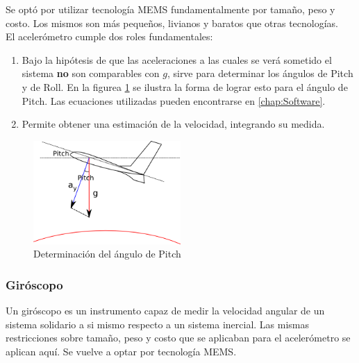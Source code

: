 \documentclass[main]{subfiles}
\begin{document}
Se opt\'o por utilizar tecnolog\'ia MEMS fundamentalmente por tama\~no, peso y costo. Los mismos son m\'as peque\~nos, livianos y baratos que otras tecnolog\'ias.\\



El aceler\'ometro cumple dos roles fundamentales:
\begin{enumerate}
\item Bajo la hip\'otesis de que las aceleraciones a las cuales se ver\'a sometido el sistema \textbf{no} son comparables con $g$, sirve para determinar los \'angulos de Pitch y de Roll. En la figurea \ref{fig:acc_pitch} se ilustra la forma de lograr esto para el \'angulo de Pitch. Las ecuaciones utilizadas pueden encontrarse en \ref{chap:Software}.
\item Permite obtener una estimaci\'on de la velocidad, integrando su medida.  
\end{enumerate}

 \begin{figure}
	\centering
	\includegraphics[width=0.5\textwidth]{./pics_eleccion_hardware/euler.png}
	\vspace{-10pt}
	\caption{Determinaci\'on del \'angulo de Pitch}
	\label{fig:acc_pitch}
\end{figure}
\subsubsection{Gir\'oscopo}
\label{giro}

Un gir\'oscopo es un instrumento capaz de medir la velocidad angular de un sistema solidario a si mismo respecto a un sistema inercial. Las mismas restricciones sobre tama\~no, peso y costo que se aplicaban para el aceler\'ometro se aplican aqu\'i. Se vuelve a optar por tecnolog\'ia MEMS.\\ 
\end{document}
